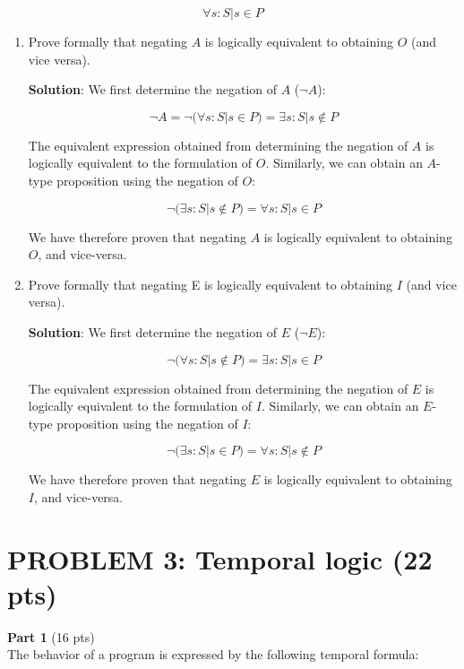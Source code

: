 \documentclass[12pt]{article}
\begin{document}
\begin{spacing}{1.5}
	$$\forall s : S | s \in P$$
							
	\begin{enumerate}
		\item Prove formally that negating $A$ is logically equivalent to obtaining $O$ (and vice versa).

		      \textbf{Solution}: We first determine the negation of $A$ ($\neg A$):

		      $$\neg A = \neg (\forall s : S | s \in P ) = \exists s : S | s \notin P$$

		      The equivalent expression obtained from determining the negation of $A$ is logically equivalent to the formulation of $O$. Similarly, we can obtain an $A$-type proposition using the negation of $O$:

		      $$\neg (\exists s : S | s \notin P) = \forall s : S | s \in P$$

		      We have therefore proven that negating $A$ is logically equivalent to obtaining $O$, and vice-versa.

		\item Prove formally that negating E is logically equivalent to obtaining $I$ (and vice versa).

		      \textbf{Solution}: We first determine the negation of $E$ ($\neg E$):

		      $$\neg (\forall s : S | s \notin P)=\exists s : S | s \in P$$

            The equivalent expression obtained from determining the negation of $E$ is logically equivalent to the formulation of $I$. Similarly, we can obtain an $E$-type proposition using the negation of $I$:

		      $$\neg (\exists s : S | s \in P) = \forall s : S | s \notin P$$

		      We have therefore proven that negating $E$ is logically equivalent to obtaining $I$, and vice-versa.

	\end{enumerate}
							    
	\newpage
							    
	\section*{PROBLEM 3: Temporal logic (22 pts)}
							
	\textbf{Part 1} (16 pts)\\
							    
	The behavior of a program is expressed by the following temporal formula:
							

\end{spacing}
\end{document}
